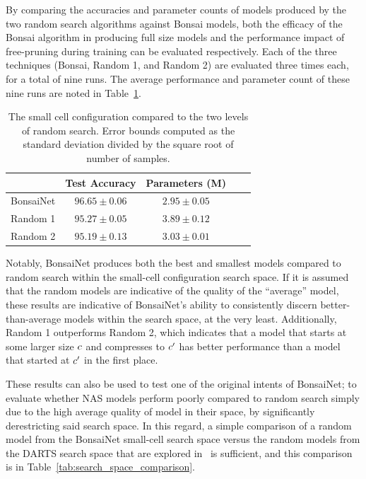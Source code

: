 By comparing the accuracies and parameter counts of models produced by the two
random search algorithms against Bonsai models, both the efficacy of the Bonsai algorithm in producing full
size models and the performance impact of free-pruning during training can be evaluated respectively. Each of the three techniques
(Bonsai, Random 1, and Random 2) are evaluated three times each, for a total of nine runs.
The average performance and parameter count of these nine runs are noted in Table~\ref{tab:random_comparison}.

\begin{table}[h]
\begin{center}
	\begin{tabular}{r|c|c|c|c}
	 & Test Accuracy & Parameters (M) \\
	\hline
	BonsaiNet    & $\mathbf{96.65\pm0.06}$ & $\mathbf{2.95\pm0.05}$ \\
	Random 1	 & $95.27\pm0.05$ & $3.89\pm0.12$ \\
	Random 2     & $95.19\pm0.13$ & $3.03\pm0.01$ \\
	\end{tabular}
\end{center}
\caption[The small cell configuration compared to the two levels of random search]{The small cell configuration compared to the two levels of random search. Error bounds computed as the standard
deviation divided by the square root of number of samples.}
\label{tab:random_comparison}
\end{table}

Notably, BonsaiNet produces both the best and smallest models compared to random search within the small-cell configuration
search space. If it is assumed that the random models are indicative of the quality of the ``average'' model,
these results are indicative of BonsaiNet's ability to consistently discern better-than-average models within the search
space, at the very least. Additionally, Random 1 outperforms Random 2, which indicates that
a model that starts at some larger size $c$ and compresses to $c'$ has better performance than a model that started at $c'$
in the first place.

These results can also be used to test one of the original intents of BonsaiNet; to evaluate whether NAS models
perform poorly compared to random search simply due to the high average quality of model in their space, by
significantly derestricting said search space. In this regard, a simple comparison of a random model from the BonsaiNet
small-cell search space versus the random models from the DARTS search space that are explored in~\cite{yu2019} is
sufficient, and this comparison is in Table~\ref{tab:search_space_comparison}.

